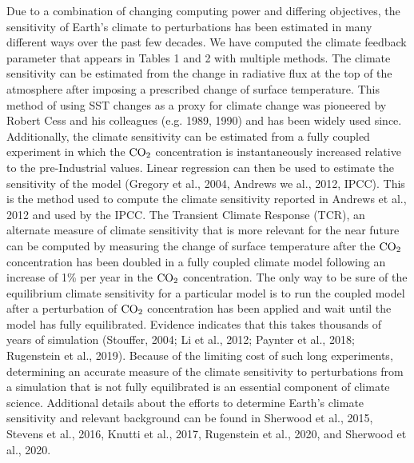 \documentclass[draft]{agujournal2019}
\begin{document}
Due to a combination of changing computing power and differing objectives, the sensitivity of Earth's climate to 
perturbations has been estimated in many different ways over the past few decades.  
We have computed the climate feedback parameter that appears in Tables 1 and 2 with multiple methods.    
The climate sensitivity can be estimated from the change in radiative flux at the top of the 
atmosphere after imposing a prescribed change of surface temperature.  This method of using SST changes
as a proxy for climate change was pioneered by Robert Cess and his colleagues (e.g. 1989, 1990) and has been widely used since.  
Additionally, the climate
sensitivity can be estimated from a fully coupled experiment in which the $\rm{CO}_{2}$ concentration is 
instantaneously increased relative to the pre-Industrial values.  Linear regression can then be used to 
estimate the sensitivity of the model (Gregory et al., 2004, Andrews we al., 2012, IPCC).  
This is the method used to compute the climate sensitivity reported in Andrews et al., 2012 
and used by the IPCC.  The Transient Climate Response (TCR), an alternate measure of climate sensitivity that is more 
relevant for the near future can be computed by measuring the change of surface temperature after the $\rm{CO}_{2}$ concentration
has been doubled in a fully coupled climate model following an increase of 1\% per year in the 
$\rm{CO}_{2}$ concentration.   
The only way to be sure of the equilibrium climate sensitivity for a particular model is to run the 
coupled model after a perturbation of $\rm{CO}_{2}$ concentration has been applied and wait until the model has fully 
equilibrated.  Evidence indicates that this takes thousands of years of 
simulation (Stouffer, 2004; Li et al., 2012; Paynter et al., 2018; Rugenstein et al., 2019).
Because of the limiting cost of such long experiments, determining an accurate measure 
of the climate sensitivity to perturbations from a simulation that is not fully equilibrated is an 
essential component of climate science.  Additional details about the efforts to determine Earth's climate sensitivity 
and relevant background can be found in Sherwood et al., 2015, Stevens et al., 2016, Knutti et al., 2017, Rugenstein et al., 2020, and Sherwood et al., 2020.  

    
\end{document}
